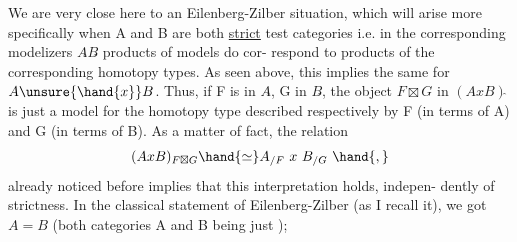 We are very close here to an Eilenberg-Zilber situation, which
will arise more specifically when A and B are both \uline{strict} test categories\hand{,}
i.e. in the corresponding modelizers $A\hat{}$\hand{,}$B\hat{}$ products of models do cor-%
respond to products of the corresponding homotopy types. As seen above,
this implies the same for $A\unsure{\hand{x}}B$. Thus, if F is in $A\hat{}$, G in $B\hat{}$, the
object $F\boxtimes G$ in $(AxB)\hat{}$ is just a model for the homotopy type described
respectively by F (in terms of A) and G (in terms of B). As a matter
of fact, the relation
\[ (AxB)_{F\boxtimes G} \hand{\simeq} A_{/F}\ x\ B_{/G}\ \hand{,} \]
already noticed before\hand{,} implies that this interpretation holds, indepen-%
dently of strictness. In the classical statement of Eilenberg-Zilber
(as I recall it), we got $A=B$ (both categories A and B being just \hand{$\Delta$});

